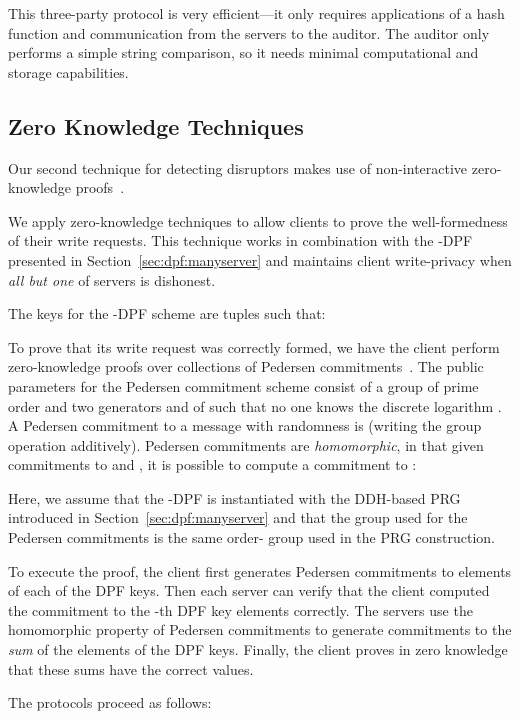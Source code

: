 \documentclass[10pt,twocolumn]{article}
\begin{document}
This three-party protocol is very efficient---it only 
requires  applications of a hash function and
 communication from the servers to the auditor.
The auditor only performs a simple string comparison, so it 
needs minimal computational and storage capabilities.


\subsection{Zero Knowledge Techniques}
\label{sec:disrupt:zkp}

Our second technique for detecting disruptors makes use
of non-interactive zero-knowledge proofs~\cite{camenisch1997proof,goldwasser1989knowledge,rackoff1992non}.

We apply zero-knowledge techniques to allow clients to prove the
well-formedness of their write requests.
This technique works in combination with the 
-DPF presented in Section~\ref{sec:dpf:manyserver}
and maintains client write-privacy 
when {\em all but one} of  servers is dishonest.

The keys for the -DPF scheme are tuples 
 such that:


To prove that its write request was correctly formed,
we have the client perform zero-knowledge proofs over
collections of Pedersen commitments~\cite{pedersen1992non}.
The public parameters for the Pedersen commitment scheme
consist of a group  of prime order  and two generators
 and  of  such that no one knows the discrete logarithm
.
A Pedersen commitment to a message  with randomness
 is 
(writing the group operation additively).
Pedersen commitments are {\em homomorphic}, in that given commitments
to  and , it is possible to compute a commitment to :


Here, we assume that the -DPF is instantiated with the
DDH-based PRG introduced in Section~\ref{sec:dpf:manyserver} and that
the group  used for the Pedersen commitments is the same order- group 
used in the PRG construction.

To execute the proof, the client first generates
Pedersen commitments to elements of each of the  DPF keys.
Then each server  can verify that the client computed the commitment
to the -th DPF key elements correctly.
The servers use the homomorphic property of Pedersen commitments 
to generate commitments to the \textit{sum} of the elements of the DPF keys.
Finally, the client proves in zero knowledge that these sums have the 
correct values.

The protocols proceed as follows:
\end{document}
